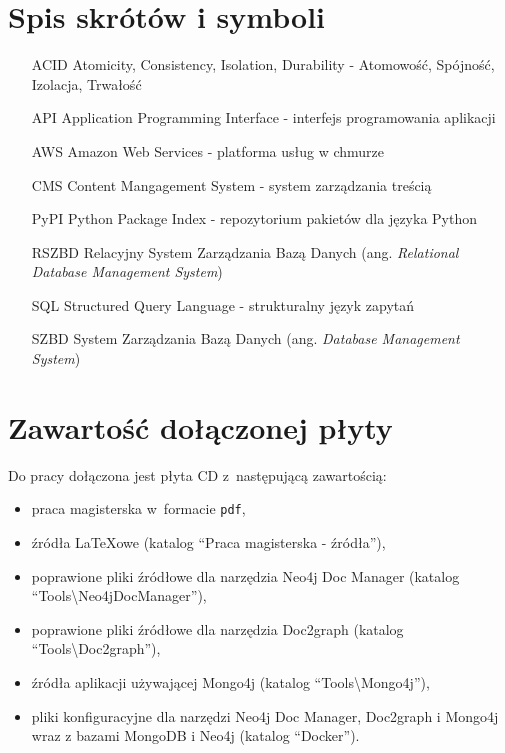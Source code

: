 \documentclass[a4paper,twoside,12pt]{book}
\newcommand{\obcy}[1]{\emph{#1}}
\newcommand{\ang}[1]{{\selectlanguage{british}\obcy{#1}}}
\begin{document}
\begin{appendices} 



\chapter*{Spis skrótów i symboli}

\begin{itemize}
\item[ACID] Atomicity, Consistency, Isolation, Durability - Atomowość, Spójność, Izolacja, Trwałość
\item[API] Application Programming Interface - interfejs programowania aplikacji
\item[AWS] Amazon Web Services - platforma usług w chmurze
\item[CMS] Content Mangagement System - system zarządzania treścią
\item[PyPI] Python Package Index - repozytorium pakietów dla języka Python
\item[RSZBD] Relacyjny System Zarządzania Bazą Danych (ang. \ang{Relational Database Management System})
\item[SQL] Structured Query Language - strukturalny język zapytań
\item[SZBD] System Zarządzania Bazą Danych (ang. \ang{Database Management System})
\end{itemize}
 

\chapter*{Zawartość dołączonej płyty}

Do pracy dołączona jest płyta CD z~następującą zawartością:
\begin{itemize}
\item praca magisterska w~formacie \texttt{pdf},
\item źródła \LaTeX owe (katalog ``Praca magisterska - źródła''), 
\item poprawione pliki źródłowe dla narzędzia Neo4j Doc Manager (katalog ``Tools\textbackslash Neo4jDocManager''), 
\item poprawione pliki źródłowe dla narzędzia Doc2graph (katalog ``Tools\textbackslash Doc2graph''), 
\item źródła aplikacji używającej Mongo4j (katalog ``Tools\textbackslash Mongo4j''), 
\item pliki konfiguracyjne dla narzędzi Neo4j Doc Manager, Doc2graph i Mongo4j wraz z bazami MongoDB i Neo4j (katalog ``Docker''). 
\end{itemize}


\end{appendices}
\end{document}
